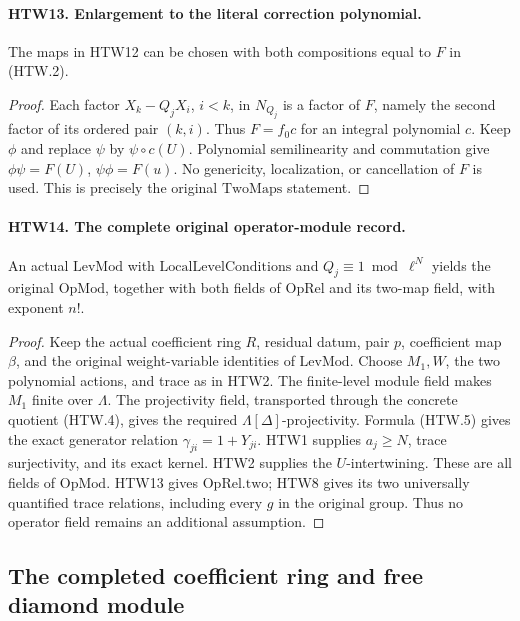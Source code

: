 \documentclass[11pt,a4paper]{article}
\numberwithin{equation}{section}
\theoremstyle{remark}\newtheorem{remark}[theorem]{Remark}
\begin{document}
\paragraph{HTW13. Enlargement to the literal correction polynomial.}
\label{claim:HTW13}
The maps in HTW12 can be chosen with both compositions
equal to \(F\) in (HTW.2).
\begin{proof}
Each factor \(X_k-Q_jX_i\), \(i<k\), in
\(N_{Q_j}\) is a factor of \(F\), namely the second
factor of its ordered pair \((k,i)\).
Thus \(F=f_0c\) for an integral polynomial \(c\).
Keep \(\phi\) and replace \(\psi\) by
\(\psi\circ c(U)\).  Polynomial semilinearity and
commutation give
\(\phi\psi=F(U)\), \(\psi\phi=F(u)\).
No genericity, localization, or cancellation of \(F\)
is used.  This is precisely the original
\(\mathrm{TwoMaps}\) statement.
\end{proof}

\paragraph{HTW14. The complete original operator-module record.}
\label{claim:HTW14}
An actual \(\mathrm{LevMod}\) with
\(\mathrm{LocalLevelConditions}\) and
\(Q_j\equiv1\bmod\ell^N\) yields the original
\(\mathrm{OpMod}\), together with both fields of
\(\mathrm{OpRel}\) and its two-map field, with exponent \(n!\).
\begin{proof}
Keep the actual coefficient ring \(R\), residual datum,
pair \(p\), coefficient map \(\beta\), and the original
weight-variable identities of \(\mathrm{LevMod}\).
Choose \(M_1,W\), the two polynomial actions, and trace
as in HTW2.  The finite-level module field makes \(M_1\)
finite over \(\Lambda\).  The projectivity field,
transported through the concrete quotient (HTW.4),
gives the required \(\Lambda[\Delta]\)-projectivity.
Formula (HTW.5) gives the exact generator relation
\(\gamma_{ji}=1+Y_{ji}\).  HTW1 supplies \(a_j\ge N\),
trace surjectivity, and its exact kernel.
HTW2 supplies the \(U\)-intertwining.
These are all fields of \(\mathrm{OpMod}\).
HTW13 gives \(\mathrm{OpRel.two}\); HTW8 gives its
two universally quantified trace relations, including
every \(g\) in the original group.  Thus no operator
field remains an additional assumption.
\end{proof}

\subsection{The completed coefficient ring and free diamond module}
\end{document}

